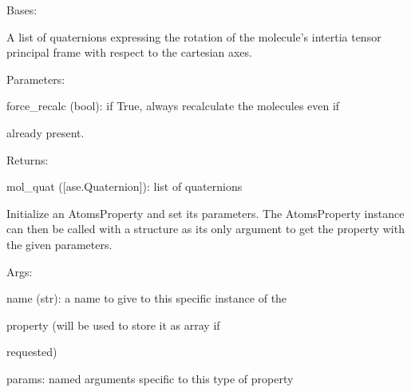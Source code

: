\documentclass[letterpaper,10pt,english]{sphinxmanual}
\begin{document}
\begin{fulllineitems}
\label{doctree/soprano.properties.linkage.linkage:soprano.properties.linkage.linkage.MoleculeQuaternion}
Bases: {\hyperref[doctree/soprano.properties.atomsproperty:soprano.properties.atomsproperty.AtomsProperty]{\emph{}}}

A list of quaternions expressing the rotation of the molecule's intertia
tensor principal frame with respect to the cartesian axes.

\begin{DUlineblock}{0em}
\item[] Parameters:
\item[]
\begin{DUlineblock}{\DUlineblockindent}
\item[] force\_recalc (bool): if True, always recalculate the molecules even if
\item[]
\begin{DUlineblock}{\DUlineblockindent}
\item[] already present.
\end{DUlineblock}
\end{DUlineblock}
\end{DUlineblock}

\begin{DUlineblock}{0em}
\item[] Returns:
\item[]
\begin{DUlineblock}{\DUlineblockindent}
\item[] mol\_quat ({[}ase.Quaternion{]}): list of quaternions
\end{DUlineblock}
\end{DUlineblock}

Initialize an AtomsProperty and set its parameters.
The AtomsProperty instance can then be called with a structure as its
only argument to get the property with the given parameters.

\begin{DUlineblock}{0em}
\item[] Args:
\item[]
\begin{DUlineblock}{\DUlineblockindent}
\item[] name (str): a name to give to this specific instance of the
\item[]
\begin{DUlineblock}{\DUlineblockindent}
\item[] property (will be used to store it as array if
\item[] requested)
\end{DUlineblock}
\item[] params: named arguments specific to this type of property
\end{DUlineblock}
\end{DUlineblock}


\end{fulllineitems}
\end{document}
